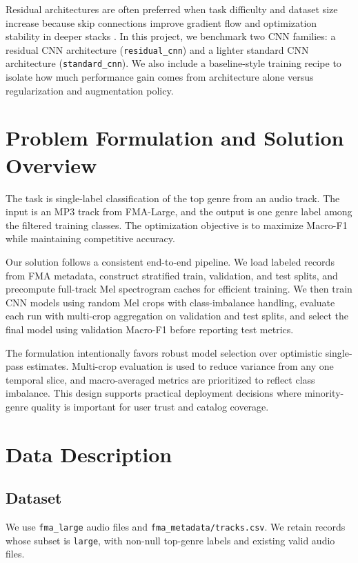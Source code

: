 \documentclass[11pt,a4paper]{article}
\begin{document}
Residual architectures are often preferred when task difficulty and dataset size increase because skip connections improve gradient flow and optimization stability in deeper stacks \cite{he2016resnet}. In this project, we benchmark two CNN families: a residual CNN architecture (\texttt{residual\_cnn}) and a lighter standard CNN architecture (\texttt{standard\_cnn}). We also include a baseline-style training recipe to isolate how much performance gain comes from architecture alone versus regularization and augmentation policy.

\section{Problem Formulation and Solution Overview}
The task is single-label classification of the top genre from an audio track. The input is an MP3 track from FMA-Large, and the output is one genre label among the filtered training classes. The optimization objective is to maximize Macro-F1 while maintaining competitive accuracy.

Our solution follows a consistent end-to-end pipeline. We load labeled records from FMA metadata, construct stratified train, validation, and test splits, and precompute full-track Mel spectrogram caches for efficient training. We then train CNN models using random Mel crops with class-imbalance handling, evaluate each run with multi-crop aggregation on validation and test splits, and select the final model using validation Macro-F1 before reporting test metrics.

The formulation intentionally favors robust model selection over optimistic single-pass estimates. Multi-crop evaluation is used to reduce variance from any one temporal slice, and macro-averaged metrics are prioritized to reflect class imbalance. This design supports practical deployment decisions where minority-genre quality is important for user trust and catalog coverage.

\section{Data Description}
\subsection{Dataset}
We use \texttt{fma\_large} audio files and \texttt{fma\_metadata/tracks.csv}. We retain records whose subset is \texttt{large}, with non-null top-genre labels and existing valid audio files.
\end{document}
